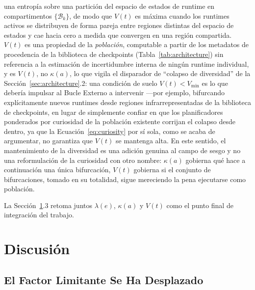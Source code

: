 \documentclass[11pt]{article}
\begin{document}
\noindent una entropía sobre una partición del espacio de estados de runtime en compartimentos $\{\mathcal{B}_k\}$, de modo que $V(t)$ es máxima cuando los runtimes activos se distribuyen de forma pareja entre regiones distintas del espacio de estados y cae hacia cero a medida que convergen en una región compartida. $V(t)$ es una propiedad de la \emph{población}, computable a partir de los metadatos de procedencia de la biblioteca de checkpoints (Tabla~\ref{tab:architecture}) sin referencia a la estimación de incertidumbre interna de ningún runtime individual, y es $V(t)$, no $\kappa(a)$, lo que vigila el disparador de ``colapso de diversidad'' de la Sección~\ref{sec:architecture}.2: una condición de suelo $V(t) < V_{\min}$ es lo que debería impulsar al Bucle Externo a intervenir —por ejemplo, bifurcando explícitamente nuevos runtimes desde regiones infrarrepresentadas de la biblioteca de checkpoints, en lugar de simplemente confiar en que los planificadores ponderados por curiosidad de la población existente corrijan el colapso desde dentro, ya que la Ecuación~\ref{eq:curiosity} por sí sola, como se acaba de argumentar, no garantiza que $V(t)$ se mantenga alta. En este sentido, el mantenimiento de la diversidad es una adición genuina al campo de sesgo y no una reformulación de la curiosidad con otro nombre: $\kappa(a)$ gobierna qué hace a continuación una única bifurcación, $V(t)$ gobierna si el conjunto de bifurcaciones, tomado en su totalidad, sigue mereciendo la pena ejecutarse como población.

La Sección~\ref{sec:discussion}.3 retoma juntos $\lambda(e)$, $\kappa(a)$ y $V(t)$ como el punto final de integración del trabajo.

\section{Discusión}
\label{sec:discussion}

\subsection{El Factor Limitante Se Ha Desplazado}
\end{document}
